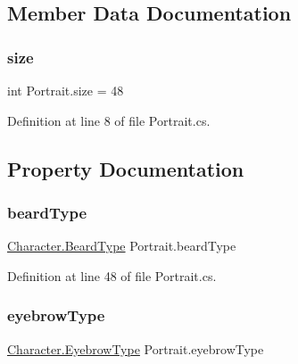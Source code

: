 \subsection{Member Data Documentation}
\mbox{\label{class_portrait_ac8488582e058dc2d20b8f2e5bdfbe427}} 
\subsubsection{\texorpdfstring{size}{size}}
{\footnotesize\ttfamily int Portrait.\+size = 48\hspace{0.3cm}{\ttfamily [static]}}



Definition at line 8 of file Portrait.\+cs.



\subsection{Property Documentation}
\mbox{\label{class_portrait_acc7fbe447bbd427f26e0490b868febd3}} 
\subsubsection{\texorpdfstring{beardType}{beardType}}
{\footnotesize\ttfamily \mbox{\hyperlink{class_character_afc1fe7f790870a92fe62d3e57296de81}{Character.\+Beard\+Type}} Portrait.\+beard\+Type\hspace{0.3cm}{\ttfamily [get]}}



Definition at line 48 of file Portrait.\+cs.

\mbox{\label{class_portrait_a1a002dfca19c85ae7724a0e3210ca97a}} 
\subsubsection{\texorpdfstring{eyebrowType}{eyebrowType}}
{\footnotesize\ttfamily \mbox{\hyperlink{class_character_a7ba51a2ab6ee02a615df9275665c5e4c}{Character.\+Eyebrow\+Type}} Portrait.\+eyebrow\+Type\hspace{0.3cm}{\ttfamily [get]}}



